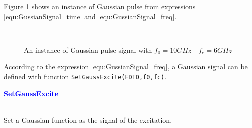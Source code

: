 Figure \ref{fig:GaussInpulseTheory} shows an instance of Gaussian pulse from expressions \ref{equ:GussianSignal_time} and \ref{equ:GussianSignal_freq}. 
    \begin{figure}[hbt]
	      \centering
	      \\
	      \caption[Gaussian pulse signal]{An instance of Gaussian pulse signal with $f_0=10GHz \quad f_c=6GHz$}
	      \label{fig:GaussInpulseTheory}
    \end{figure}
According to the expression \ref{equ:GussianSignal_freq}, a Gaussian signal can be defined with function \hyperref[func:SetGaussExcite]{\texttt{SetGaussExcite(FDTD,f0,fc)}}.

\textcolor{blue}{\begin{large}\textbf{SetGaussExcite}	\end{large}} \label{func:SetGaussExcite}\\
	  Set a Gaussian function as the signal of the excitation.

